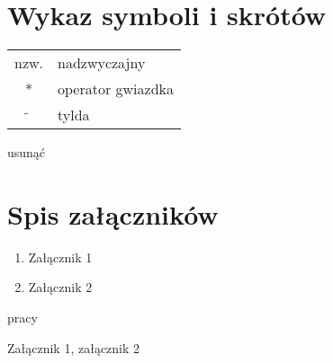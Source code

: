 \documentclass[a4paper,11pt,twoside]{report}
\theoremstyle{definition}
\begin{document}
\chapter*{Wykaz symboli i skrótów}

\begin{tabular}{cl}
nzw. & nadzwyczajny \\
* & operator gwiazdka \\
$\widetilde{}$ & tylda
\end{tabular}
\thispagestyle{empty}


\listoffigures
\thispagestyle{empty}


\renewcommand{\listtablename}{Spis tabel}
\listoftables
\thispagestyle{empty}



usunąć

\chapter*{Spis załączników}
\begin{enumerate}[itemsep = 0pt]
\item Załącznik 1
\item Załącznik 2
\end{enumerate}
\thispagestyle{empty}

pracy

\newpage
\pagestyle{empty} 
Załącznik 1, załącznik 2
\end{document}

